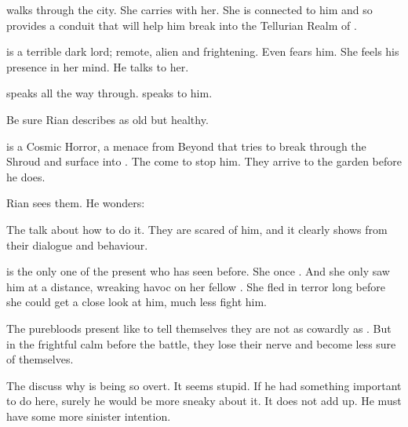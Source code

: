 \begin{changes}
    \begin{comment}
      \subparagraph{Criseis on the walk through the city}
    \end{comment}
    \Criseis walks through the city.
    She carries \Ishnaruchaefir with her.
    She is connected to him and so provides a conduit that will help him break into the Tellurian Realm of \Azmith. 
    
    \Ishnaruchaefir is a terrible dark lord; remote, alien and frightening. 
    Even \Criseis fears him. 
    She feels his presence in her mind.
    He talks to her. 
    
    \Ishnaruchaefir speaks \TrueDraconic all the way through.
    \Criseis speaks \CommonDraconic to him.
    
    Be sure Rian describes \Criseis as old but healthy. 
    
    \begin{comment}
      \subparagraph{\Resphain arrive}
    \end{comment}
    \Ishnaruchaefir is a Cosmic Horror, a menace from Beyond that tries to break through the Shroud and surface into \Malcur.
    The \resphain come to stop him. 
    They arrive to the garden before he does. 
    
    Rian sees them. 
    He wonders:
    
    The \resphain talk about how to do it. 
    They are scared of him, and it clearly shows from their dialogue and behaviour. 
    
    \Achsah is the only one of the \resphain present who has seen \Ishnaruchaefir before. 
    She once . 
    And she only saw him at a distance, wreaking havoc on her fellow \resphain.
    She fled in terror long before she could get a close look at him, much less fight him. 
    
    The purebloods present like to tell themselves they are not as cowardly as \Achsah. 
    But in the frightful calm before the battle, they lose their nerve and become less sure of themselves. 
    
    The \resphain discuss why \Ishnaruchaefir is being so overt. 
    It seems stupid.
    If he had something important to do here, surely he would be more sneaky about it.
    It does not add up.
    He must have some more sinister intention.
    

\end{changes}
